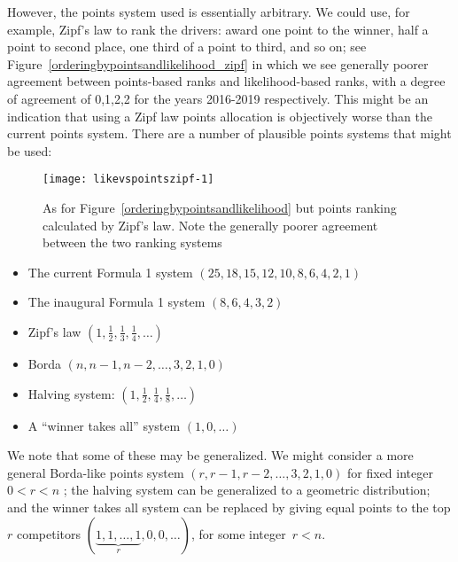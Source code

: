\documentclass[a4,12pt]{article}
\begin{document}
However, the points system used is essentially arbitrary.  We could
use, for example, Zipf's law to rank the drivers: award one point to
the winner, half a point to second place, one third of a point to
third, and so on; see Figure~\ref{orderingbypointsandlikelihood_zipf}
in which we see generally poorer agreement between points-based ranks
and likelihood-based ranks, with a degree of agreement of 0,1,2,2 for
the years 2016-2019 respectively.  This might be an indication that
using a Zipf law points allocation is objectively worse than the
current points system.  There are a number of plausible points systems
that might be used:

\begin{figure}
{\centering \texttt{[image: likevspointszipf-1]}}
\caption[\doublespacing As for
  Figure~\ref{orderingbypointsandlikelihood} \label{orderingbypointsandlikelihood_zipf}
  but points ranking calculated by Zipf's law]{\doublespacing As for
  Figure~\ref{orderingbypointsandlikelihood} \label{orderingbypointsandlikelihood_zipf}
  but points ranking calculated by Zipf's law. Note the generally
  poorer agreement between the two ranking
  systems}\label{fig:likevspointszipf}
\end{figure}

\begin{itemize}
\item The current Formula 1 system $(25,18,15,12,10,8,6,4,2,1)$
\item The inaugural Formula 1 system $(8,6,4,3,2)$
\item Zipf's law $(1,\frac{1}{2},\frac{1}{3},\frac{1}{4},\ldots)$
\item Borda $(n,n-1,n-2,\ldots,3,2,1,0)$
\item Halving system:  $(1,\frac{1}{2},\frac{1}{4},\frac{1}{8},\ldots)$
\item A ``winner takes all'' system $(1,0,\ldots)$
\end{itemize}

We note that some of these may be generalized.  We might consider a
more general Borda-like points system $(r,r-1,r-2,\ldots,3,2,1,0)$ for
fixed integer $0<r<n$ \citep{emerson2007}; the halving system can be
generalized to a geometric distribution; and the winner takes all
system can be replaced by giving equal points to the top \(r\)
competitors $(\underbrace{1,1,\ldots ,1}_{r},0,0,\ldots)$, for some
integer~$r<n$.
\end{document}
